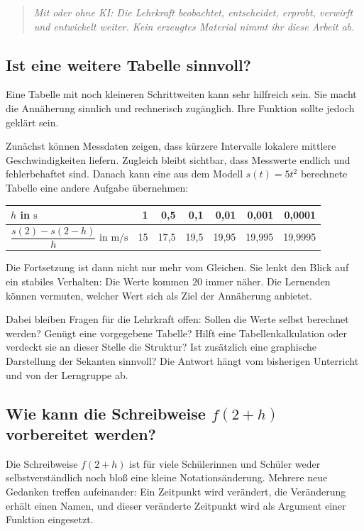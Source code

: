 \documentclass[11pt,a4paper]{article}
\newenvironment{leitgedanke}
  {\begin{quote}\color{dunkelblau}\itshape}
  {\end{quote}}
\begin{document}
\begin{leitgedanke}
Mit oder ohne KI: Die Lehrkraft beobachtet, entscheidet, erprobt, verwirft und
entwickelt weiter. Kein erzeugtes Material nimmt ihr diese Arbeit ab.
\end{leitgedanke}


\subsection{Ist eine weitere Tabelle sinnvoll?}

Eine Tabelle mit noch kleineren Schrittweiten kann sehr hilfreich sein. Sie
macht die Annäherung sinnlich und rechnerisch zugänglich. Ihre Funktion sollte
jedoch geklärt sein.

Zunächst können Messdaten zeigen, dass kürzere Intervalle lokalere mittlere
Geschwindigkeiten liefern. Zugleich bleibt sichtbar, dass Messwerte endlich und
fehlerbehaftet sind. Danach kann eine aus dem Modell $s(t)=5t^2$ berechnete
Tabelle eine andere Aufgabe übernehmen:

\begin{center}
\begin{tabular}{@{}lrrrrrr@{}}
\toprule
$h$ in $\mathrm{s}$
  & 1 & 0{,}5 & 0{,}1 & 0{,}01 & 0{,}001 & 0{,}0001 \\
\midrule
$\dfrac{s(2)-s(2-h)}{h}$ in $\mathrm{m/s}$
  & 15 & 17{,}5 & 19{,}5 & 19{,}95 & 19{,}995 & 19{,}9995 \\
\bottomrule
\end{tabular}
\end{center}

Die Fortsetzung ist dann nicht nur \glqq mehr vom Gleichen\grqq. Sie lenkt den
Blick auf ein stabiles Verhalten: Die Werte kommen $20$ immer näher. Die
Lernenden können vermuten, welcher Wert sich als Ziel der Annäherung anbietet.

Dabei bleiben Fragen für die Lehrkraft offen: Sollen die Werte selbst berechnet
werden? Genügt eine vorgegebene Tabelle? Hilft eine Tabellenkalkulation oder
verdeckt sie an dieser Stelle die Struktur? Ist zusätzlich eine graphische
Darstellung der Sekanten sinnvoll? Die Antwort hängt vom bisherigen Unterricht
und von der Lerngruppe ab.


\subsection{Wie kann die Schreibweise
\texorpdfstring{$f(2+h)$}{f(2+h)} vorbereitet werden?}

Die Schreibweise $f(2+h)$ ist für viele Schülerinnen und Schüler weder
selbstverständlich noch bloß eine kleine Notationsänderung. Mehrere neue
Gedanken treffen aufeinander: Ein Zeitpunkt wird verändert, die Veränderung
erhält einen Namen, und dieser veränderte Zeitpunkt wird als Argument einer
Funktion eingesetzt.
\end{document}
